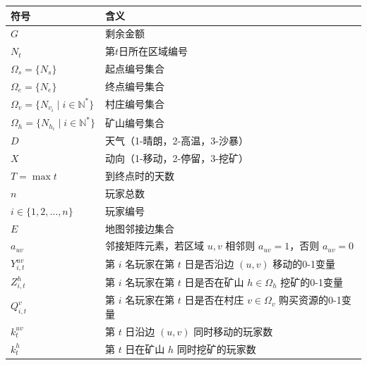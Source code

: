 \begin{table}[H]
\centering
\begin{tabularx}{\textwidth}{
  >{\centering\arraybackslash}X  %
  >{\centering\arraybackslash}p{}  %
  }
    \toprule[1.5pt]  %
    \midrule
    符号 & 含义 \\
    \midrule
    $G$ & 剩余金额 \\

$N_t$ & 第$t$日所在区域编号 \\

$\Omega_s = \{N_s\}$ & 起点编号集合 \\

$\Omega_e = \{N_e\}$ & 终点编号集合 \\

$\Omega_v = \{N_{v_i} \mid i\in\mathbb{N}^*\}$ & 村庄编号集合 \\

$\Omega_h = \{N_{h_i} \mid i\in\mathbb{N}^*\}$ & 矿山编号集合 \\

$D$ & 天气（1-晴朗，2-高温，3-沙暴） \\

$X$ & 动向（1-移动，2-停留，3-挖矿） \\

$T = \max t$ & 到终点时的天数 \\

$n$ & 玩家总数 \\

$i\in\{1,2,\dots,n\}$ & 玩家编号 \\

$E$ & 地图邻接边集合 \\

$a_{uv}$ & 邻接矩阵元素，若区域 $u,v$ 相邻则 $a_{uv}=1$，否则 $a_{uv}=0$ \\

$Y_{i,t}^{uv}$ & 第 $i$ 名玩家在第 $t$ 日是否沿边 $(u,v)$ 移动的0-1变量 \\

$Z_{i,t}^{h}$ & 第 $i$ 名玩家在第 $t$ 日是否在矿山 $h\in\Omega_h$ 挖矿的0-1变量 \\

$Q_{i,t}^{v}$ & 第 $i$ 名玩家在第 $t$ 日是否在村庄 $v\in\Omega_v$ 购买资源的0-1变量 \\

$k_t^{uv}$ & 第 $t$ 日沿边 $(u,v)$ 同时移动的玩家数 \\

$k_t^{h}$ & 第 $t$ 日在矿山 $h$ 同时挖矿的玩家数 \\


\end{tabularx}
\end{table}

